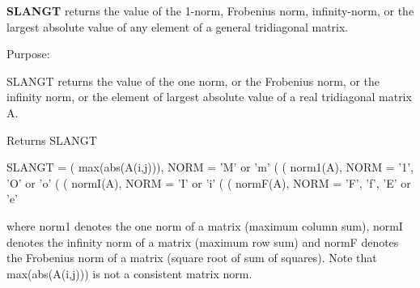 {\bfseries S\+L\+A\+N\+G\+T} returns the value of the 1-\/norm, Frobenius norm, infinity-\/norm, or the largest absolute value of any element of a general tridiagonal matrix. 

 \begin{DoxyParagraph}{Purpose\+: }
\begin{DoxyVerb} SLANGT  returns the value of the one norm,  or the Frobenius norm, or
 the  infinity norm,  or the  element of  largest absolute value  of a
 real tridiagonal matrix A.\end{DoxyVerb}

\end{DoxyParagraph}
\begin{DoxyReturn}{Returns}
S\+L\+A\+N\+G\+T \begin{DoxyVerb}    SLANGT = ( max(abs(A(i,j))), NORM = 'M' or 'm'
             (
             ( norm1(A),         NORM = '1', 'O' or 'o'
             (
             ( normI(A),         NORM = 'I' or 'i'
             (
             ( normF(A),         NORM = 'F', 'f', 'E' or 'e'

 where  norm1  denotes the  one norm of a matrix (maximum column sum),
 normI  denotes the  infinity norm  of a matrix  (maximum row sum) and
 normF  denotes the  Frobenius norm of a matrix (square root of sum of
 squares).  Note that  max(abs(A(i,j)))  is not a consistent matrix norm.\end{DoxyVerb}
 
\end{DoxyReturn}

